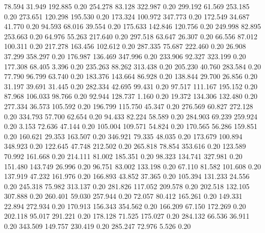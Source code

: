   78.594   31.949  192.885         0.20
 254.278   83.128  322.987         0.20
 299.192   61.569  253.185         0.20
 273.651  120.298  195.530         0.20
 173.324  100.972  347.773         0.20
 172.549   34.687   41.770         0.20
  94.593   68.016   39.554         0.20
 175.633  142.846  120.756         0.20
 249.998   82.895  253.663         0.20
  64.976   55.263  217.640         0.20
 297.518   63.647   26.307         0.20
  66.556   87.012  100.311         0.20
 217.278  163.456  102.612         0.20
 287.335   75.687  222.460         0.20
  26.908   37.299  358.297         0.20
 176.987  136.469  347.996         0.20
 233.906   92.327  323.199         0.20
 177.308   68.405    3.396         0.20
 235.263   88.262  313.438         0.20
 205.230   40.760  283.584         0.20
  77.790   96.799   63.740         0.20
 183.376  143.664   86.928         0.20
 138.844   29.700   26.856         0.20
  31.197   39.691   31.445         0.20
 282.334   42.695   99.431         0.20
  97.517  111.167  195.152         0.20
  87.968  106.033   98.766         0.20
  92.944  128.737    1.160         0.20
  19.372  134.306  132.480         0.20
 277.334   36.573  105.592         0.20
 196.799  115.750   45.347         0.20
 276.569   60.827  272.128         0.20
 334.793   57.700   62.654         0.20
  94.433   82.224   58.589         0.20
 284.903   69.239  259.924         0.20
   3.153   72.636   47.144         0.20
 105.004  109.571   54.824         0.20
 170.565   56.286  159.851         0.20
 160.621   29.353  163.507         0.20
 346.921   79.335   48.035         0.20
 173.679  100.894  348.923         0.20
 122.645   47.748  212.502         0.20
 265.818   78.854  353.616         0.20
 123.589   70.992  161.668         0.20
 214.111   81.002  185.351         0.20
  98.323  134.741  327.981         0.20
 151.480  143.749   26.996         0.20
  96.751   83.002  133.198         0.20
  67.110   81.582  101.608         0.20
 137.919   47.232  161.976         0.20
 166.893   43.852   37.365         0.20
 105.394  131.233   24.556         0.20
 245.318   75.982  313.137         0.20
 281.826  117.052  209.578         0.20
 202.518  132.105  307.888         0.20
 260.401   59.030  257.944         0.20
  72.057   80.412  165.261         0.20
 149.331   22.894  272.934         0.20
 170.913  156.343  354.562         0.20
 166.209   67.150  172.269         0.20
 202.118   95.017  291.221         0.20
 178.128   71.525  175.027         0.20
 284.132   66.536   36.911         0.20
 343.509  149.757  230.419         0.20
 285.247   72.976    5.526         0.20

